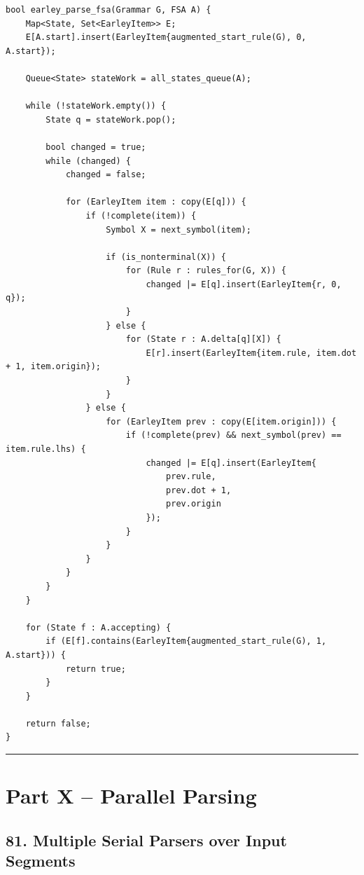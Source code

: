 \documentclass[10pt,letterpaper]{article}
\begin{document}
\begin{verbatim}
bool earley_parse_fsa(Grammar G, FSA A) {
    Map<State, Set<EarleyItem>> E;
    E[A.start].insert(EarleyItem{augmented_start_rule(G), 0, A.start});

    Queue<State> stateWork = all_states_queue(A);

    while (!stateWork.empty()) {
        State q = stateWork.pop();

        bool changed = true;
        while (changed) {
            changed = false;

            for (EarleyItem item : copy(E[q])) {
                if (!complete(item)) {
                    Symbol X = next_symbol(item);

                    if (is_nonterminal(X)) {
                        for (Rule r : rules_for(G, X)) {
                            changed |= E[q].insert(EarleyItem{r, 0, q});
                        }
                    } else {
                        for (State r : A.delta[q][X]) {
                            E[r].insert(EarleyItem{item.rule, item.dot + 1, item.origin});
                        }
                    }
                } else {
                    for (EarleyItem prev : copy(E[item.origin])) {
                        if (!complete(prev) && next_symbol(prev) == item.rule.lhs) {
                            changed |= E[q].insert(EarleyItem{
                                prev.rule,
                                prev.dot + 1,
                                prev.origin
                            });
                        }
                    }
                }
            }
        }
    }

    for (State f : A.accepting) {
        if (E[f].contains(EarleyItem{augmented_start_rule(G), 1, A.start})) {
            return true;
        }
    }

    return false;
}
\end{verbatim}

\medskip\hrule\medskip

\clearpage
\section*{Part X -- Parallel Parsing}

\subsection*{81. Multiple Serial Parsers over Input Segments}
\end{document}

